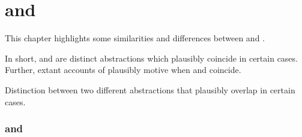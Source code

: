 \chapter{\issueInclusion{} and }
\label{sec:reasons}


\begin{note}
  This chapter highlights some similarities and differences between  and .

  In short,  and  are distinct abstractions which plausibly coincide in certain cases.
  Further, extant accounts of  plausibly motive \issueInclusion{} when  and  coincide.
\end{note}

\begin{note}
  Distinction between two different abstractions that plausibly overlap in certain cases.
\end{note}


\subsection{ and }

